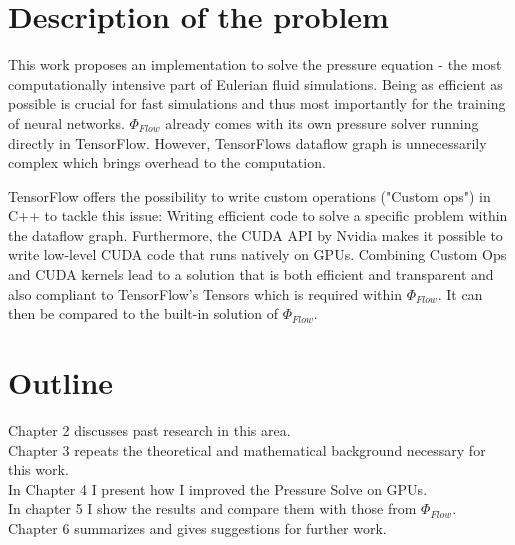 \section{Description of the problem}
This work proposes an implementation to solve the pressure equation - the most computationally intensive part of Eulerian fluid simulations. Being as efficient as possible is crucial for fast simulations and thus most importantly for the training of neural networks. $\Phi_\textit{Flow}$ already comes with its own pressure solver running directly in TensorFlow. However, TensorFlows dataflow graph is unnecessarily complex which brings overhead to the computation.
\par TensorFlow offers the possibility to write custom operations ("Custom ops") in C++ to tackle this issue: Writing efficient code to solve a specific problem within the dataflow graph. Furthermore, the CUDA API by Nvidia makes it possible to write low-level CUDA code that runs natively on GPUs. Combining Custom Ops and CUDA kernels lead to a solution that is both efficient and transparent and also compliant to TensorFlow's Tensors which is required within $\Phi_\textit{Flow}$. It can then be compared to the built-in solution of $\Phi_\textit{Flow}$.
\section{Outline}
Chapter 2 discusses past research in this area.\\
Chapter 3 repeats the theoretical and mathematical background necessary for this work.\\
In Chapter 4 I present how I improved the Pressure Solve on GPUs.\\
In chapter 5 I show the results and compare them with those from $\Phi_\textit{Flow}$.\\
Chapter 6 summarizes and gives suggestions for further work.\\

